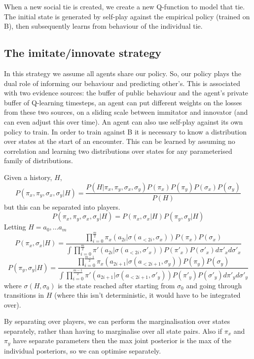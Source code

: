 \documentclass[a4paper]{report}
\begin{document}
When a new social tie is created, we create a new Q-function to model that tie. The initial state is generated by self-play against the empirical policy (trained on B), then subsequently learns from behaviour of the individual tie.

\subsection{The imitate/innovate strategy}

In this strategy we assume all agents share our policy. So, our policy plays the dual role of informing our behaviour and predicting other's. This is associated with two evidence sources: the buffer of public behaviour and the agent's private buffer of Q-learning timesteps, an agent can put different weights on the losses from these two sources, on a sliding scale between immitator and innovator (and can even adjust this over time). An agent can also use self-play against its own policy to train. In order to train against B it is necessary to know a distribution over states at the start of an encounter. This can be learned by assuming no correlation and learning two distributions over states for any parameterised family of distributions.

Given a history, $H$,
\[
P(\pi_x,\pi_y,\sigma_x,\sigma_y|H) = \frac{P(H|\pi_x,\pi_y,\sigma_x, \sigma_y)P(\pi_x)P(\pi_y)P(\sigma_x)P(\sigma_y)}{P(H)}
\]
but this can be separated into players.
\[
P(\pi_x,\pi_y,\sigma_x,\sigma_y|H) = P(\pi_x,\sigma_x|H)P(\pi_y,\sigma_y|H)
\]
Letting $H=a_0,...a_m$
\[
P(\pi_x,\sigma_x|H)= 
\frac{\prod_{i=0}^{\frac{m}{2}} \pi_x(a_{2i}| \sigma(a_{<2i},\sigma_x))P(\pi_x)P(\sigma_x)}
{\int\prod_{i=0}^{\frac{m}{2}} \pi'(a_{2i}| \sigma(a_{<2i},\sigma'_x))P(\pi'_x)P(\sigma'_x) d\pi'_x d\sigma'_x}
\]
\[
P(\pi_y,\sigma_y|H) = \frac{\prod_{i=0}^{\frac{m-1}{2}} \pi_x(a_{2i+1}| \sigma(a_{<2i+1},\sigma_y))P(\pi_y)P(\sigma_y)}
{\int\prod_{i=0}^{\frac{m-1}{2}} \pi'(a_{2i+1}| \sigma(a_{<2i+1},\sigma'_y))P(\pi'_y)P(\sigma'_y) d\pi'_y d\sigma'_y}
\]
where $\sigma(H,\sigma_0)$ is the state reached after starting from $\sigma_0$ and going through transitions in $H$ (where this isn't deterministic, it would have to be integrated over).
 
By separating over players, we can perform the marginalisation over states separately, rather than having to marginalise over all state pairs. Also if $\pi_x$ and $\pi_y$ have separate parameters then the max joint posterior is the max of the individual posteriors, so we can optimise separately.
\end{document}
